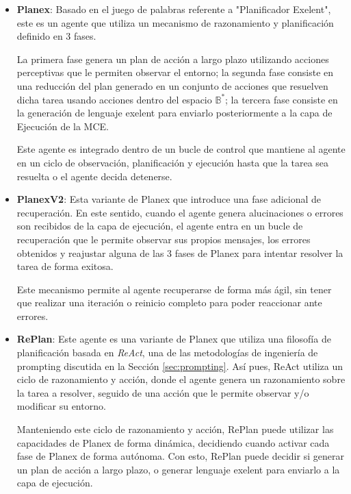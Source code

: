 \begin{itemize}
    \item \textbf{Planex}: Basado en el juego de palabras referente 
    a "Planificador Exelent", este es un agente que utiliza un mecanismo de 
    razonamiento y planificación definido en 3 fases. 

    La primera fase genera un plan de acción a largo plazo 
    utilizando acciones perceptivas que le permiten observar 
    el entorno; la segunda fase consiste en una reducción del plan
    generado en un conjunto de acciones que resuelven dicha tarea
    usando acciones dentro del espacio \(\mathbb{B}^*\); la tercera
    fase consiste en la generación de lenguaje exelent para enviarlo
    posteriormente a la capa de Ejecución de la MCE.

    Este agente es integrado dentro de un bucle de control que mantiene
    al agente en un ciclo de observación, planificación y ejecución hasta
    que la tarea sea resuelta o el agente decida detenerse.

    \item \textbf{PlanexV2}: Esta variante de Planex que introduce una fase
    adicional de recuperación. En este sentido, cuando el agente genera alucinaciones
    o errores son recibidos de la capa de ejecución, el agente entra en un bucle
    de recuperación que le permite observar sus propios mensajes, los errores obtenidos
    y reajustar alguna de las 3 fases de Planex para intentar resolver la tarea
    de forma exitosa.

    Este mecanismo permite al agente recuperarse de forma más ágil, sin tener que
    realizar una iteración o reinicio completo para poder reaccionar ante errores.

    \item \textbf{RePlan}: Este agente es una variante de Planex que utiliza
    una filosofía de planificación basada en \emph{ReAct}, una de las metodologías
    de ingeniería de prompting discutida en la Sección \ref{sec:prompting}. Así pues,
    ReAct utiliza  un ciclo de razonamiento y acción, donde el agente
    genera un razonamiento sobre la tarea a resolver, seguido de una acción
    que le permite observar y/o modificar su entorno.

    Manteniendo este ciclo de razonamiento y acción, RePlan puede utilizar las capacidades
    de Planex de forma dinámica, decidiendo cuando activar cada fase de Planex de 
    forma autónoma. Con esto, RePlan puede decidir si generar un plan de acción 
    a largo plazo, o generar lenguaje exelent para enviarlo a la capa de ejecución.



\end{itemize}
